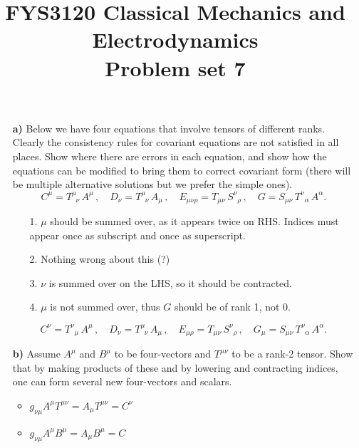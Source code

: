 \documentclass[11pt,a4paper]{report}
\title{FYS3120 Classical Mechanics and Electrodynamics\\ 
\vspace{15mm}Problem set 7}
\newcounter{excount}[chapter]
\newenvironment{exercise}[1][]{\addtocounter{excount}{1} \noindent {\bf Problem
    \arabic{excount} \ \ #1}\hspace{2mm}}{\vspace{4mm}}
\begin{document}
\maketitle


\begin{exercise}
\begin{itemize}
\item[\bf a)] Below we have four equations that involve tensors of different ranks. Clearly the consistency rules for covariant equations are not satisfied in all places. Show where there are errors in each equation, and show how the equations can be modified to bring them to correct covariant form (there will be multiple alternative solutions but we prefer the simple ones).
\begin{equation}
C^{\mu}=T^{\mu}_{\;\;\nu}\, A^{\mu}\,,\quad D_{\nu}=T^{\mu}_{\;\;\nu} \,A_{\mu}\,,\quad
E_{\mu\nu\rho}=T_{\mu\nu}\,S^{\nu}_{\;\;\rho}\,,\quad G=S_{\mu\nu}\,T^{\nu}_{\;\;\alpha}\, A^{\alpha}.
\end{equation}
\begin{itemize}
\item[1.]$\mu$ should be summed over, as it appears twice on RHS. Indices must appear once as subscript and once as superscript. 
\item[2.]
Nothing wrong about this (?)
\item[3.]
$\nu$ is summed over on the LHS, so it should be contracted.

\item[4.]
$\mu$ is not summed over, thus $G$ should be of rank 1, not 0.
\end{itemize}
\begin{equation}
C^{\nu}=T^{\nu}_{\;\;\mu}\, A^{\mu}\,,\quad D_{\nu}=T^{\mu}_{\;\;\nu} \,A_{\mu}\,,\quad
E_{\mu\rho}=T_{\mu\nu}\,S^{\nu}_{\;\;\rho}\,,\quad G_{\mu}=S_{\mu\nu}\,T^{\nu}_{\;\;\alpha}\, A^{\alpha}.
\end{equation}

\item[\bf b)] Assume $A^\mu$ and $B^\mu$  to be four-vectors and $T^{\mu\nu}$ to be a rank-2 tensor. Show that by making products of these and by lowering and contracting indices, one can form several new four-vectors and scalars.
\begin{itemize}
\item $g_{\nu \mu} A^\mu T^{\mu\nu}=A_{\mu} T^{\mu\nu}=C^{\nu}$ 
\item $g_{\nu \mu} A^\mu B^\mu=A_{\mu} B^\mu=C$ 
\end{itemize}




\end{itemize}
\end{exercise}
\end{document}
